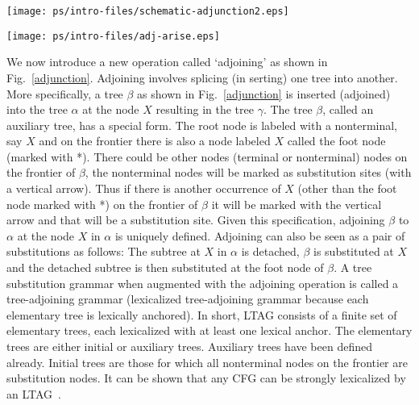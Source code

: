 \begin{figure*}[ht] 
\begin{center}
\texttt{[image: ps/intro-files/schematic-adjunction2.eps]}
\caption{\label{adjunction} Adjoining}
\end{center}
\end{figure*}

\begin{figure*}[ht] 
\begin{center}
\texttt{[image: ps/intro-files/adj-arise.eps]}
\caption{\label{tsg-adj} Adjoining arises out of lexicalization}
\end{center}
\end{figure*}

We now introduce a new operation called `adjoining' as shown in
Fig.~\ref{adjunction}. Adjoining involves splicing (in serting) one
tree into another. More specifically, a tree $\beta$ as shown in
Fig.~\ref{adjunction} is inserted (adjoined) into the tree $\alpha$ at
the node $X$ resulting in the tree $\gamma$. The tree $\beta$, called
an auxiliary tree, has a special form. The root node is labeled with a
nonterminal, say $X$ and on the frontier there is also a node labeled
$X$ called the foot node (marked with *). There could be other nodes
(terminal or nonterminal) nodes on the frontier of $\beta$, the
nonterminal nodes will be marked as substitution sites (with a
vertical arrow). Thus if there is another occurrence of $X$ (other
than the foot node marked with *) on the frontier of $\beta$ it will
be marked with the vertical arrow and that will be a substitution
site. Given this specification, adjoining $\beta$ to $\alpha$ at the
node $X$ in $\alpha$ is uniquely defined. Adjoining can also be seen
as a pair of substitutions as follows: The subtree at $X$ in $\alpha$
is detached, $\beta$ is substituted at $X$ and the detached subtree is
then substituted at the foot node of $\beta$. A tree substitution
grammar when augmented with the adjoining operation is called a
tree-adjoining grammar (lexicalized tree-adjoining grammar because
each elementary tree is lexically anchored). In short, LTAG consists
of a finite set of elementary trees, each lexicalized with at least
one lexical anchor. The elementary trees are either initial or
auxiliary trees. Auxiliary trees have been defined already. Initial
trees are those for which all nonterminal nodes on the frontier are
substitution nodes. It can be shown that any CFG can be strongly
lexicalized by an LTAG~\cite{joshischabes96}.

